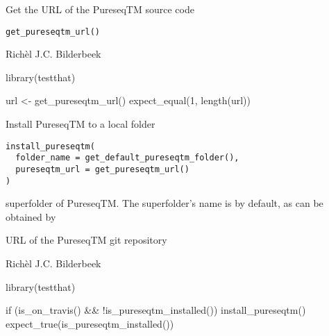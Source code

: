 \documentclass[letterpaper]{book}
\begin{document}
%
\begin{Description}\relax
Get the URL of the PureseqTM source code
\end{Description}
%
\begin{Usage}
\begin{verbatim}
get_pureseqtm_url()
\end{verbatim}
\end{Usage}
%
\begin{Author}\relax
Richèl J.C. Bilderbeek
\end{Author}
%
\begin{Examples}
\begin{ExampleCode}
library(testthat)

url <- get_pureseqtm_url()
expect_equal(1, length(url))
\end{ExampleCode}
\end{Examples}
%
\begin{Description}\relax
Install PureseqTM to a local folder
\end{Description}
%
\begin{Usage}
\begin{verbatim}
install_pureseqtm(
  folder_name = get_default_pureseqtm_folder(),
  pureseqtm_url = get_pureseqtm_url()
)
\end{verbatim}
\end{Usage}
%
\begin{Arguments}
\begin{ldescription}
\item[\code{folder\_name}] superfolder of PureseqTM.
The superfolder's name is 
by default, as can be obtained by

\item[\code{pureseqtm\_url}] URL of the PureseqTM git repository
\end{ldescription}
\end{Arguments}
%
\begin{Author}\relax
Richèl J.C. Bilderbeek
\end{Author}
%
\begin{Examples}
\begin{ExampleCode}
library(testthat)

if (is_on_travis() && !is_pureseqtm_installed()) {
  install_pureseqtm()
  expect_true(is_pureseqtm_installed())
}
\end{ExampleCode}
\end{Examples}
\end{document}
